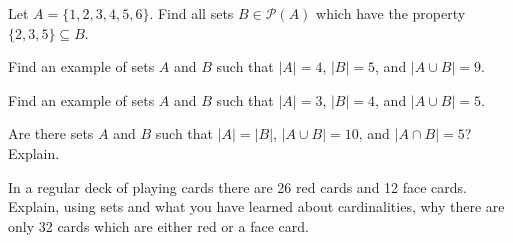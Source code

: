 \documentclass[10pt,]{book}
\theoremstyle{plain}
\theoremstyle{definition}
\theoremstyle{definition}
\theoremstyle{definition}
\theoremstyle{definition}
\numberwithin{equation}{chapter}
\def\pow{\mathcal P}
\begin{document}
\begin{divisionexercise}{12}\hypertarget{exercise-198}{}
\hypertarget{p-1579}{}%
Let \(A = \{1,2,3,4,5,6\}\). Find all sets \(B \in \pow(A)\) which have the property \(\{2,3,5\} \subseteq B\).%
\end{divisionexercise}%
\begin{divisionexercise}{13}\hypertarget{exercise-199}{}
\hypertarget{p-1580}{}%
Find an example of sets \(A\) and \(B\) such that \(|A| = 4\), \(|B| = 5\), and \(|A \cup B| = 9\).%
\end{divisionexercise}%
\begin{divisionexercise}{14}\hypertarget{exercise-200}{}
\hypertarget{p-1582}{}%
Find an example of sets \(A\) and \(B\) such that \(|A| = 3\), \(|B| = 4\), and \(|A \cup B| = 5\).%
\end{divisionexercise}%
\begin{divisionexercise}{15}\hypertarget{exercise-201}{}
\hypertarget{p-1583}{}%
Are there sets \(A\) and \(B\) such that \(|A| = |B|\), \(|A\cup B| = 10\), and \(|A\cap B| = 5\)? Explain.%
\end{divisionexercise}%
\begin{divisionexercise}{16}\hypertarget{exercise-202}{}
\hypertarget{p-1584}{}%
In a regular deck of playing cards there are 26 red cards and 12 face cards. Explain, using sets and what you have learned about cardinalities, why there are only 32 cards which are either red or a face card.%
\end{divisionexercise}%
\typeout{************************************************}
\typeout{************************************************}
\end{document}
